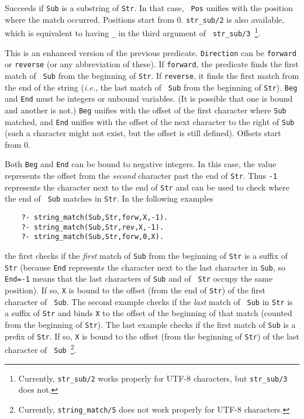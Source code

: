 \begin{description}

Succeeds if {\tt Sub} is a substring of {\tt Str}. In that case, {\tt
  Pos} unifies with the position where the match occurred. Positions
start from 0. {\tt str\_sub/2} is also available, which is equivalent
to having {\tt \_} in the third argument of {\tt
  str\_sub/3}~\footnote{Currently, {\tt str\_sub/2} works properly for
  UTF-8 characters, but {\tt str\_sub/3} does not.}.


This is an enhanced version of the previous predicate.
{\tt Direction} can be {\tt forward} or {\tt reverse} (or any abbreviation
of these). If {\tt forward}, the predicate finds the first match of {\tt
  Sub} from the beginning of {\tt Str}. If {\tt reverse}, it finds the
first match from the end of the string ({\it i.e.}, the last match of {\tt
  Sub} from the beginning of {\tt Str}). {\tt Beg} and {\tt End} must be
integers or unbound variables. (It is possible that one is bound and
another is not.)
{\tt Beg} unifies with the offset of the first character where {\tt Sub}
matched, and {\tt End} unifies with the offset of the next character to the
right of {\tt Sub} (such a character might not exist, but the offset is
still defined). Offsets start from 0.

Both {\tt Beg} and {\tt End} can be bound to negative integers.
In this case, the value represents the offset from the \emph{second}
character past the end of {\tt Str}. Thus {\tt -1} represents the character
next to the end of {\tt Str} and can be used to check where the end of {\tt
  Sub}  matches in {\tt Str}. In the following examples
\begin{verbatim}
    ?- string_match(Sub,Str,forw,X,-1).  
    ?- string_match(Sub,Str,rev,X,-1).  
    ?- string_match(Sub,Str,forw,0,X).  
\end{verbatim}
the first checks if the \emph{first} match of {\tt Sub} from the
beginning of {\tt Str} is a suffix of {\tt Str} (because {\tt End}
represents the character next to the last character in {\tt Sub}, so
{\tt End=-1} means that the last characters of {\tt Sub} and of {\tt
  Str} occupy the same position). If so, {\tt X} is bound to the
offset (from the end of {\tt Str}) of the first character of {\tt
  Sub}. The second example checks if the \emph{last} match of {\tt
  Sub} in {\tt Str} is a suffix of {\tt Str} and binds {\tt X} to the
offset of the beginning of that match (counted from the beginning of
{\tt Str}).  The last example checks if the first match of {\tt Sub}
is a prefix of {\tt Str}. If so, {\tt X} is bound to the offset (from
the beginning of {\tt Str}) of the last character of {\tt
  Sub}~\footnote{Currently, {\tt string\_match/5} does not work
  properly for UTF-8 characters.}.


\end{description}
